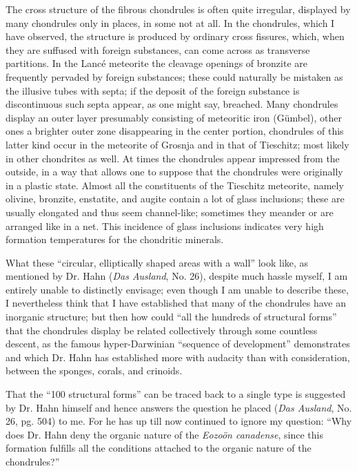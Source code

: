 \documentclass[a4paper, 12pt, oneside]{article}
\begin{document}
The cross structure of the fibrous chondrules is often quite irregular, displayed by many chondrules only in places, in some not at all. In the chondrules, which I have observed, the structure is produced by ordinary cross fissures, which, when they are suffused with foreign substances, can come across as transverse partitions. In the Lancé meteorite the cleavage openings of bronzite are frequently pervaded by foreign substances; these could naturally be mistaken as the illusive tubes with septa; if the deposit of the foreign substance is discontinuous such septa appear, as one might say, breached. Many chondrules display an outer layer presumably consisting of meteoritic iron (Gümbel), other ones a brighter outer zone disappearing in the center portion, chondrules of this latter kind occur in the meteorite of Grosnja and in that of Tieschitz; most likely in other chondrites as well. At times the chondrules appear impressed from the outside, in a way that allows one to suppose that the chondrules were originally in a plastic state. Almost all the constituents of the Tieschitz meteorite, namely olivine, bronzite, enstatite, and augite contain a lot of glass inclusions; these are usually elongated and thus seem channel-like; sometimes they meander or are arranged like in a net. This incidence of glass inclusions indicates very high formation temperatures for the chondritic minerals.

What these ``circular, elliptically shaped areas with a wall'' look like, as mentioned by Dr. Hahn (\emph{Das Ausland}, No. 26), despite much hassle myself, I am entirely unable to distinctly envisage; even though I am unable to describe these, I nevertheless think that I have established that many of the chondrules have an inorganic structure; but then how could ``all the hundreds of structural forms'' that the chondrules display be related collectively through some countless descent, as the famous hyper-Darwinian ``sequence of development'' demonstrates and which Dr. Hahn has established more with audacity than with consideration, between the sponges, corals, and crinoids.

That the ``100 structural forms'' can be traced back to a single type is suggested by Dr. Hahn himself and hence answers the question he placed (\emph{Das Ausland}, No. 26, pg. 504) to me. For he has up till now continued to ignore my question: ``Why does Dr. Hahn deny the organic nature of the \emph{Eozoön canadense}, since this formation fulfills all the conditions attached to the organic nature of the chondrules?''
\end{document}
